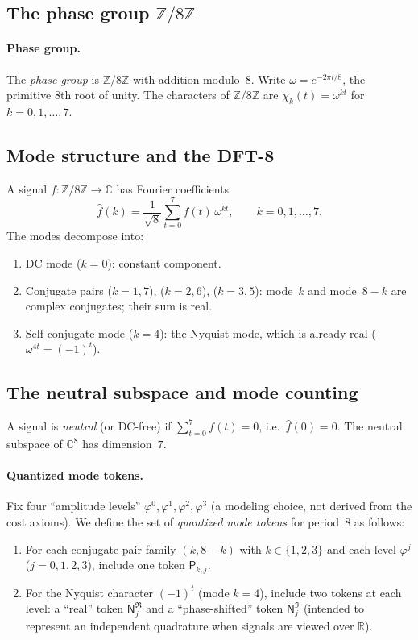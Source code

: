 \documentclass[11pt,reqno]{amsart}
\theoremstyle{plain}
\theoremstyle{definition}
\theoremstyle{remark}
\newcommand{\phig}{\varphi}
\newcommand{\RR}{\mathbb{R}}
\newcommand{\ZZ}{\mathbb{Z}}
\newcommand{\CC}{\mathbb{C}}
\newcommand{\1}{\mathbf{1}}
\begin{document}
\subsection{The phase group \texorpdfstring{$\ZZ/8\ZZ$}{Z/8Z}} \paragraph{Phase group.}\label{def:phase}
The \emph{phase group} is $\ZZ/8\ZZ$ with addition modulo~$8$.
 Write $\omega=e^{-2\pi i/8}$, the primitive 8th root of unity.
The characters of $\ZZ/8\ZZ$ are $\chi_k(t)=\omega^{kt}$ for
$k=0,1,\ldots,7$. \subsection{Mode structure and the DFT-8}\label{ssec:dft8} A signal $f:\ZZ/8\ZZ\to\CC$ has Fourier coefficients
\begin{equation}\label{eq:dft8} \hat f(k)=\frac{1}{\sqrt8}\sum_{t=0}^{7}f(t)\,\omega^{kt}, \qquad k=0,1,\ldots,7.
\end{equation}
The modes decompose into:
\begin{enumerate}[label=(\alph*),nosep]
\item DC mode ($k=0$): constant component.
\item Conjugate pairs ($k=1,7$), ($k=2,6$), ($k=3,5$): mode~$k$ and mode~$8{-}k$ are complex conjugates; their sum is real.
\item Self-conjugate mode ($k=4$): the Nyquist mode, which is already real ($\omega^{4t}=(-1)^t$).
\end{enumerate} \subsection{The neutral subspace and mode counting} A signal is \emph{neutral} (or DC-free) if
$\sum_{t=0}^7 f(t)=0$, i.e.\ $\hat f(0)=0$. The neutral
subspace of $\CC^8$ has dimension~$7$. \paragraph{Quantized mode tokens.}\label{def:mode-tokens}
Fix four ``amplitude levels'' $\phig^0,\phig^1,\phig^2,\phig^3$ (a modeling choice, not derived from the cost axioms). We define the set of \emph{quantized mode tokens} for period~$8$ as follows:
\begin{enumerate}[label=\textnormal{(\roman*)}, nosep]
\item For each conjugate-pair family $(k,8{-}k)$ with $k\in\{1,2,3\}$ and each level $\phig^j$ ($j=0,1,2,3$), include one token $\mathsf{P}_{k,j}$.
\item For the Nyquist character $(-1)^t$ (mode $k=4$), include two tokens at each level: a ``real'' token $\mathsf{N}^{\Re}_j$ and a ``phase-shifted'' token $\mathsf{N}^{\Im}_j$ (intended to represent an independent quadrature when signals are viewed over $\RR$).
\end{enumerate}
\end{document}
